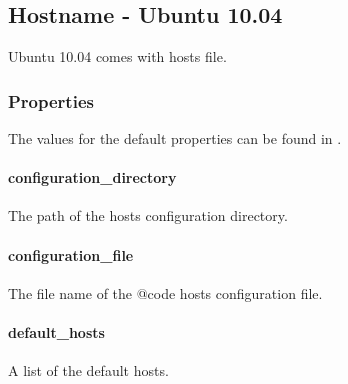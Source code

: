 \subsection{Hostname - Ubuntu 10.04}

Ubuntu 10.04 comes with hosts file.

\subsubsection{Properties}

The values for the default properties can be found
in .

\paragraph{configuration\_directory}


The path of the hosts configuration directory.

\paragraph{configuration\_file}


The file name of the {@code hosts} configuration file.

\paragraph{default\_hosts}


A list of the default hosts.

